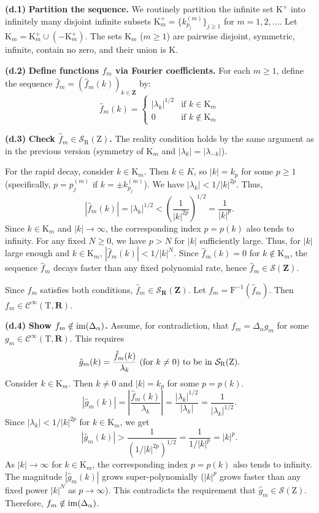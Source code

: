 \documentclass[10pt,letterpaper,reqno]{amsart}
\theoremstyle{article}
\newcommand{\1}{{\hat 1}}
\newcommand{\0}{{\hat 0}}
\newcommand{\RR}{\mathbf R}
\newcommand{\ZZ}{\mathbf Z}
\newcommand{\cS}{{\mathcal S}}
\def \F{\mathrm F}
\def \K{\mathrm K}
\def \R{\mathrm R}
\def \T{\mathrm T}
\def \Z{\mathrm Z}
\renewcommand{\over}{\above .2pt}
\newcommand{\Cinfty}{\mathcal{C}^\infty}
\newcommand{\im}{\operatorname{\rm im}}
\begin{document}
    \textbf{(d.1)} \textbf{Partition the sequence.}
    We routinely partition the infinite set $\K^+$ into infinitely many disjoint infinite subsets $\K_m^+ = \{k_{p_j}^{(m)}\}_{j\ge 1}$ for $m=1, 2, \dots$.
    Let $\K_m = \K_m^+ \cup (-\K_m^+)$.
    The sets $\K_m$ ($m \ge 1$) are pairwise disjoint,
    symmetric,
    infinite,
    contain no zero,
    and their union is $\K$.
    
    \textbf{(d.2)} \textbf{Define functions $f_m$ via Fourier coefficients.}
    For each $m \ge 1$,
    define the sequence $\hat{f}_m = (\hat{f}_m(k))_{k \in \ZZ}$ by:
    $$
      \hat{f}_m(k) = \begin{cases}
      |\lambda_k|^{1/2} & \text{if } k \in \K_m \\ 0 & \text{if } k \notin \K_m
      \end{cases}
      $$
    
    \textbf{(d.3)} \textbf{Check $\hat{f}_m \in \cS_{\R}(\Z)$.}
    The reality condition holds by the same argument as in the previous version (symmetry of $\K_m$ and $|\lambda_k|=|\lambda_{-k}|$).
    
    For the rapid decay,
    consider $k \in \K_m$.
    Then $k \in K$,
    so $|k| = k_p$ for some $p \ge 1$ (specifically, $p=p_j^{(m)}$ if $k=\pm k_{p_j}^{(m)}$).
    We have $|\lambda_k| < 1/|k|^{2p}$.
    Thus,
    $$
      |\hat{f}_m(k)| = |\lambda_k|^{1/2} < \left(\frac{1}{|k|^{2p}}\right)^{1/2} = \frac{1}{|k|^p}.
      $$
    Since $k \in \K_m$ and $|k| \to \infty$,
    the corresponding index $p=p(k)$ also tends to infinity.
    For any fixed $N \ge 0$,
    we have $p > N$ for $|k|$ sufficiently large.
    Thus,
    for $|k|$ large enough and $k \in \K_m$,
    $|\hat{f}_m(k)| < 1/|k|^N$.
    Since $\hat{f}_m(k)=0$ for $k \notin \K_m$,
    the sequence $\hat{f}_m$ decays faster than any fixed polynomial rate,
    hence $\hat{f}_m \in \cS(\ZZ)$.
    
    Since $\hat{f}_m$ satisfies both conditions,
    $\hat{f}_m \in \cS_{\RR}(\ZZ)$.
    Let $f_m = \F^{-1}(\hat{f}_m)$.
    Then $f_m \in \Cinfty(\T, \RR)$.
    
    \textbf{(d.4)} \textbf{Show $f_m \notin \im(\Delta_\alpha)$.}
    Assume,
    for contradiction,
    that $f_m = \Delta_\alpha g_m$ for some $g_m \in \Cinfty(\T, \RR)$.
    This requires
    $$
      \hat{g}_m(k) = {\hat{f}_m(k) \over \lambda_k} \ \text{(for $k \neq 0$) to be in $\cS_{\R}(\Z)$}.
      $$
    Consider $k \in \K_m$.
    Then $k \neq 0$ and $|k|=k_p$ for some $p=p(k)$.
    $$
      |\hat{g}_m(k)| = \left| \frac{\hat{f}_m(k)}{\lambda_k} \right| = \frac{|\lambda_k|^{1/2}}{|\lambda_k|} = \frac{1}{|\lambda_k|^{1/2}}.
      $$
    Since $|\lambda_k| < 1/|k|^{2p}$ for $k \in \K_m$,
    we get
    $$
      |\hat{g}_m(k)| > \frac{1}{(1/|k|^{2p})^{1/2}} = \frac{1}{1/|k|^p} = |k|^p.
      $$
    As $|k| \to \infty$ for $k \in \K_m$,
    the corresponding index $p=p(k)$ also tends to infinity.
    The magnitude $|\hat{g}_m(k)|$ grows super-polynomially ($|k|^p$ grows faster than any fixed power $|k|^N$ as $p \to \infty$).
    This contradicts the requirement that $\hat{g}_m \in \cS(\Z)$.
    Therefore,
    $f_m \notin \im(\Delta_\alpha)$.
    
\end{document}
